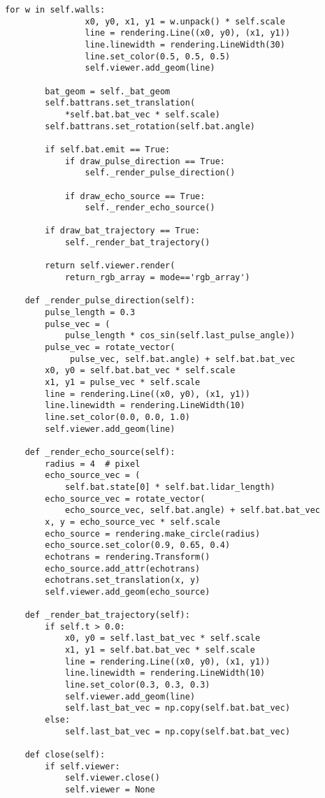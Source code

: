 \documentclass[../appendix]{subfiles}
\begin{document}
\begin{lstlisting}[frame=single]
            for w in self.walls:
                x0, y0, x1, y1 = w.unpack() * self.scale
                line = rendering.Line((x0, y0), (x1, y1))
                line.linewidth = rendering.LineWidth(30)
                line.set_color(0.5, 0.5, 0.5)
                self.viewer.add_geom(line)
        
        bat_geom = self._bat_geom
        self.battrans.set_translation(
            *self.bat.bat_vec * self.scale)
        self.battrans.set_rotation(self.bat.angle)

        if self.bat.emit == True: 
            if draw_pulse_direction == True:
                self._render_pulse_direction()

            if draw_echo_source == True:
                self._render_echo_source()
           
        if draw_bat_trajectory == True:
            self._render_bat_trajectory()

        return self.viewer.render(
            return_rgb_array = mode=='rgb_array')

    def _render_pulse_direction(self):
        pulse_length = 0.3
        pulse_vec = (
            pulse_length * cos_sin(self.last_pulse_angle))
        pulse_vec = rotate_vector(
             pulse_vec, self.bat.angle) + self.bat.bat_vec
        x0, y0 = self.bat.bat_vec * self.scale
        x1, y1 = pulse_vec * self.scale
        line = rendering.Line((x0, y0), (x1, y1))
        line.linewidth = rendering.LineWidth(10)
        line.set_color(0.0, 0.0, 1.0)
        self.viewer.add_geom(line)
    
    def _render_echo_source(self):
        radius = 4  # pixel
        echo_source_vec = (
            self.bat.state[0] * self.bat.lidar_length)
        echo_source_vec = rotate_vector(
            echo_source_vec, self.bat.angle) + self.bat.bat_vec
        x, y = echo_source_vec * self.scale
        echo_source = rendering.make_circle(radius)
        echo_source.set_color(0.9, 0.65, 0.4)
        echotrans = rendering.Transform()
        echo_source.add_attr(echotrans)
        echotrans.set_translation(x, y)
        self.viewer.add_geom(echo_source)
    
    def _render_bat_trajectory(self):
        if self.t > 0.0:
            x0, y0 = self.last_bat_vec * self.scale
            x1, y1 = self.bat.bat_vec * self.scale
            line = rendering.Line((x0, y0), (x1, y1))
            line.linewidth = rendering.LineWidth(10)
            line.set_color(0.3, 0.3, 0.3)
            self.viewer.add_geom(line)
            self.last_bat_vec = np.copy(self.bat.bat_vec)
        else:
            self.last_bat_vec = np.copy(self.bat.bat_vec)

    def close(self):
        if self.viewer:
            self.viewer.close()
            self.viewer = None
\end{lstlisting}
\end{document}
